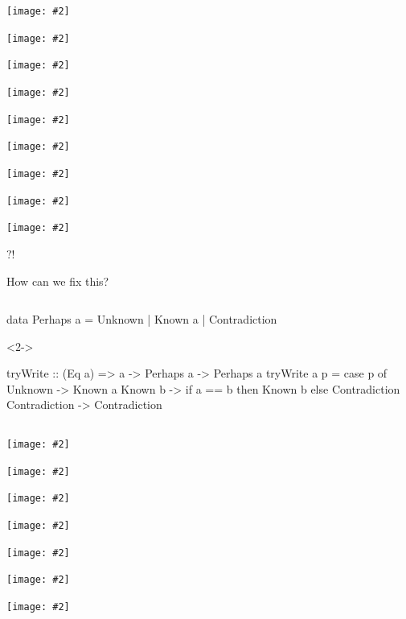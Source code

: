 \documentclass[UKenglish,usenames,dvipsnames,svgnames,table,aspectratio=169,mathserif]{beamer}
\newcommand{\nl}{\vspace{\baselineskip}}
\newcommand{\imageslide}[2][1]{{
\begin{frame}\begin{center}
\texttt{[image: \#2]}
\end{center}\end{frame}
}}
\begin{document}
\imageslide{oscillator0.pdf}
\imageslide{oscillator1.pdf}
\imageslide{oscillator2.pdf}
\imageslide{oscillator3.pdf}
\imageslide{oscillator4.pdf}
\imageslide{oscillator5.pdf}
\imageslide{oscillator6.pdf}
\imageslide{oscillator7.pdf}
\imageslide{oscillator8.pdf}


\begin{frame}
\centering
\fontsize{60}{70}\selectfont $?!$

\end{frame}


\begin{frame}
\centering \huge

How can we fix this?
\end{frame}


\begin{frame}[fragile]
\begin{columns}
\begin{overlayarea}{\textwidth}{0.6\textheight}
\begin{haskellcode}
data Perhaps a
  = Unknown
  | Known a
  | Contradiction
\end{haskellcode}

\nl


\begin{onlyenv}<2->
\begin{haskellcode}
tryWrite :: (Eq a) => a -> Perhaps a -> Perhaps a
tryWrite a p = case p of
  Unknown -> Known a
  Known b -> if a == b then Known b else Contradiction
  Contradiction -> Contradiction
\end{haskellcode}
\end{onlyenv}
\end{overlayarea}
\end{columns}
\end{frame}


\imageslide{oscillator-fixed1.pdf}
\imageslide{oscillator-fixed2.pdf}
\imageslide{oscillator-fixed3.pdf}
\imageslide{oscillator-fixed4.pdf}
\imageslide{oscillator-fixed5.pdf}
\imageslide{oscillator-fixed6.pdf}
\imageslide{oscillator-fixed7.pdf}
\end{document}
